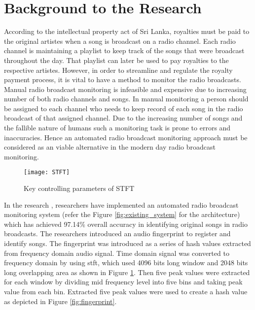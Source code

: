 \section{Background to the Research}
\vspace{12pt}

According to the intellectual property act of Sri Lanka\cite{CopyrightAct}, royalties must be paid to the original
artistes when a song is broadcast on a radio channel. Each radio channel is maintaining a playlist to keep track of
the songs that were broadcast throughout the day. That playlist can later be used to pay royalties to the respective
artistes. However, in order to streamline and regulate the royalty payment process, it is vital to have a method to monitor the radio 
broadcasts. Manual radio broadcast monitoring is infeasible and expensive due to increasing number of both radio 
channels and songs. In manual monitoring a person should be assigned to each channel who needs to keep record of each 
song in the radio broadcast of that assigned channel. Due to the increasing number of songs and the fallible nature of
humans such a monitoring task is prone to errors and inaccuracies. Hence an automated radio broadcast 
monitoring approach must be considered as an viable alternative in the modern day radio broadcast monitoring.
\vspace{12pt}

\begin{figure}[H]
    \centering
    \texttt{[image: STFT]}
    \caption{Key controlling parameters of STFT\cite{Nishan}}
    \label{fig:stft}
\end{figure}
\vspace{12pt}

In the research \cite{Nishan}, researchers have implemented an
automated radio broadcast monitoring system (refer the Figure \ref{fig:existing_system} for the architecture) which has 
achieved 97.14\% overall accuracy in identifying original songs
in radio broadcasts. The researchers introduced an audio fingerprint to register and identify songs. The fingerprint was
introduced as a series of hash values extracted from frequency domain audio signal. Time domain signal was converted to 
frequency domain by using \gls{stft}, which used 4096 bits long window and 2048
bits long overlapping area as shown in Figure \ref{fig:stft}. Then five peak values were extracted for each window by 
dividing mid frequency level into five bins and taking peak value from each bin. Extracted five peak values were used to 
create a hash value as depicted in Figure \ref{fig:fingerprint}. 

